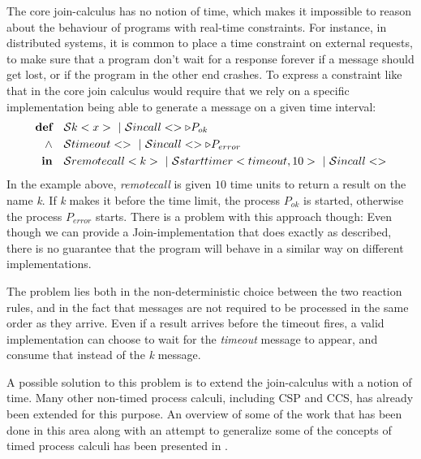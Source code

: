 The core join-calculus has no notion of time, which makes it
impossible to reason about the behaviour of programs with real-time
constraints.  For instance, in distributed systems, it is common to
place a time constraint on external requests, to make sure that a
program don't wait for a response forever if a message should get
lost, or if the program in the other end crashes. To express a
constraint like that in the core join calculus would require that we
rely on a specific implementation being able to generate a message on
a given time interval:
\begin{align*}
  \textbf{def}\quad & \S k<x> ~|~ \S incall<> \triangleright P_{ok} \\
  \land\quad & \S timeout<> ~|~ \S incall<> \triangleright P_{error} \\
  \textbf{in}\quad & \S remotecall<k> ~|~ \S starttimer<timeout, 10>
                                      ~|~ \S incall<>
\end{align*}
In the example above, \emph{remotecall} is given $10$ time units to
return a result on the name \emph{k}. If \emph{k} makes it before the
time limit, the process $P_{ok}$ is started, otherwise the process
$P_{error}$ starts.  There is a problem with this approach though:
Even though we can provide a Join-implementation that does exactly as
described, there is no guarantee that the program will behave in a
similar way on different implementations.

The problem lies both in the non-deterministic choice between the two
reaction rules, and in the fact that messages are not required to be
processed in the same order as they arrive. Even if a result arrives
before the timeout fires, a valid implementation can choose to wait
for the \emph{timeout} message to appear, and consume that instead of
the \emph{k} message.

A possible solution to this problem is to extend the join-calculus
with a notion of time. Many other non-timed process calculi, including
CSP and CCS, has already been extended for this purpose. An overview
of some of the work that has been done in this area along with an
attempt to generalize some of the concepts of timed process calculi
has been presented in \cite{nicollin-overview}.

